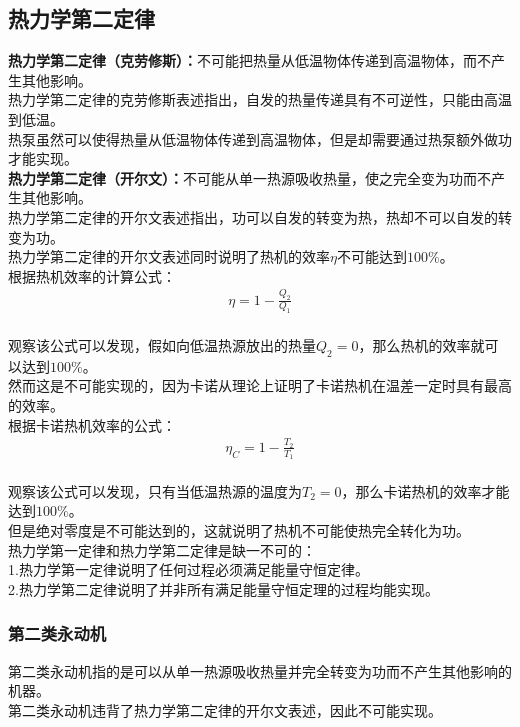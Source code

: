 \documentclass[UTF8]{ctexart}
\begin{document}
\newpage

\subsection{热力学第二定律}
    \setcounter{equation}{0}
    \textbf{热力学第二定律（克劳修斯）：}不可能把热量从低温物体传递到高温物体，而不产生其他影响。\\[3mm]
    热力学第二定律的克劳修斯表述指出，自发的热量传递具有不可逆性，只能由高温到低温。\\[3mm]
    热泵虽然可以使得热量从低温物体传递到高温物体，但是却需要通过热泵额外做功才能实现。\\[12mm]
    \textbf{热力学第二定律（开尔文）：}不可能从单一热源吸收热量，使之完全变为功而不产生其他影响。\\[3mm]
    热力学第二定律的开尔文表述指出，功可以自发的转变为热，热却不可以自发的转变为功。\\[3mm]
    热力学第二定律的开尔文表述同时说明了热机的效率$\eta$不可能达到$100\%$。\\[6mm]
    根据热机效率的计算公式：
    \begin{align}
        \eta=1-\frac{Q_2}{Q_1}
    \end{align}\\
    观察该公式可以发现，假如向低温热源放出的热量$Q_2=0$，那么热机的效率就可以达到$100\%$。\\[3mm]
    然而这是不可能实现的，因为卡诺从理论上证明了卡诺热机在温差一定时具有最高的效率。\\[8mm]
    根据卡诺热机效率的公式：
    \begin{align}
        \eta_C=1-\frac{T_2}{T_1}
    \end{align}\\
    观察该公式可以发现，只有当低温热源的温度为$T_2=0$，那么卡诺热机的效率才能达到$100\%$。\\[3mm]
    但是绝对零度是不可能达到的，这就说明了热机不可能使热完全转化为功。\\[12mm]
    热力学第一定律和热力学第二定律是缺一不可的：\\[3mm]
    1.热力学第一定律说明了任何过程必须满足能量守恒定律。\\[3mm]
    2.热力学第二定律说明了并非所有满足能量守恒定理的过程均能实现。

\subsubsection{第二类永动机}
    第二类永动机指的是可以从单一热源吸收热量并完全转变为功而不产生其他影响的机器。\\[3mm]
    第二类永动机违背了热力学第二定律的开尔文表述，因此不可能实现。
\end{document}

